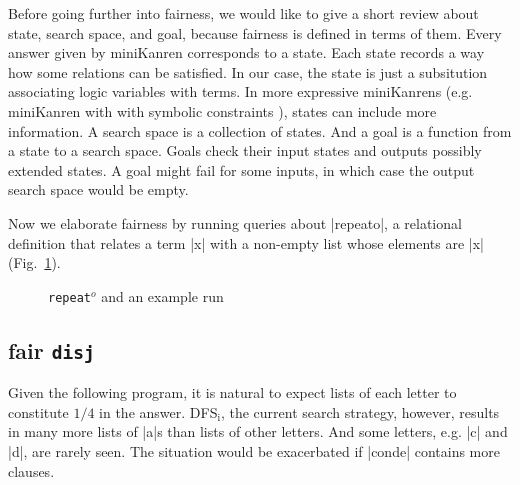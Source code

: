 \documentclass[format=acmlarge, review=true, authordraft=true]{acmart}
\newtheorem{defn}{Definition}[section]
\begin{document}
Before going further into fairness, we would like to give a short review about 
state, search space, and goal, because fairness is defined in terms of them. 
Every answer given by miniKanren corresponds to a state. Each state records a 
way how some relations can be satisfied. In our case, the state is just a 
subsitution associating logic variables with terms. In more expressive 
miniKanrens (e.g. miniKanren with with symbolic constraints 
\citep{hemann2017framework}), states can include more information. A search 
space is a collection of states. And a goal is a function from a state to a 
search space. Goals check their input states and outputs possibly extended 
states. A goal might fail for some inputs, in which case the output search 
space would be empty.

Now we elaborate fairness by running queries about \scheme|repeato|, a 
relational definition that relates a term \scheme|x| with a non-empty list whose 
elements are \scheme|x| (Fig.~\ref{repeato}).

% 

\begin{figure}
	\caption{\texttt{repeat$^o$} and an example run}
	\label{repeato}
\end{figure}

\subsection{fair \texttt{disj}}

Given the following program, it is natural to expect lists of each letter to
constitute $1/4$ in the answer. DFS$_\textrm{i}$, the current search
strategy, however, results in many more lists of \scheme|a|s than lists
of other letters. And some letters, e.g. \scheme|c| and \scheme|d|, are
rarely seen. The situation would be exacerbated if \scheme|conde| 
contains more clauses.

\begin{center}
    \begin{schemeregion}
    \end{schemeregion}
\end{center}
\end{document}
